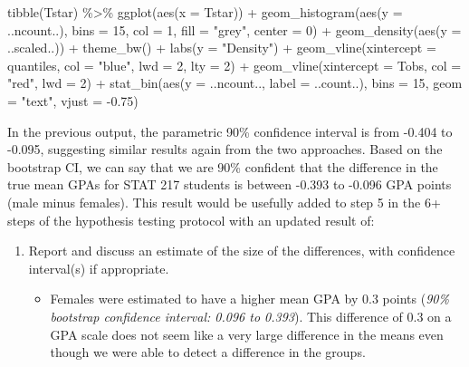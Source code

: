 \documentclass[
]{book}
\newenvironment{Shaded}{\begin{snugshade}}{\end{snugshade}}
\newcommand{\AttributeTok}[1]{\textcolor[rgb]{0.77,0.63,0.00}{#1}}
\newcommand{\DecValTok}[1]{\textcolor[rgb]{0.00,0.00,0.81}{#1}}
\newcommand{\FloatTok}[1]{\textcolor[rgb]{0.00,0.00,0.81}{#1}}
\newcommand{\FunctionTok}[1]{\textcolor[rgb]{0.00,0.00,0.00}{#1}}
\newcommand{\NormalTok}[1]{#1}
\newcommand{\SpecialCharTok}[1]{\textcolor[rgb]{0.00,0.00,0.00}{#1}}
\newcommand{\StringTok}[1]{\textcolor[rgb]{0.31,0.60,0.02}{#1}}
\providecommand{\tightlist}{%
  \setlength{\itemsep}{0pt}\setlength{\parskip}{0pt}}
\begin{document}
\begin{Shaded}
\begin{Highlighting}[]
\FunctionTok{tibble}\NormalTok{(Tstar) }\SpecialCharTok{\%\textgreater{}\%} \FunctionTok{ggplot}\NormalTok{(}\FunctionTok{aes}\NormalTok{(}\AttributeTok{x =}\NormalTok{ Tstar)) }\SpecialCharTok{+} 
  \FunctionTok{geom\_histogram}\NormalTok{(}\FunctionTok{aes}\NormalTok{(}\AttributeTok{y =}\NormalTok{ ..ncount..), }\AttributeTok{bins =} \DecValTok{15}\NormalTok{, }\AttributeTok{col =} \DecValTok{1}\NormalTok{, }\AttributeTok{fill =} \StringTok{"grey"}\NormalTok{, }
                 \AttributeTok{center =} \DecValTok{0}\NormalTok{) }\SpecialCharTok{+} 
  \FunctionTok{geom\_density}\NormalTok{(}\FunctionTok{aes}\NormalTok{(}\AttributeTok{y =}\NormalTok{ ..scaled..)) }\SpecialCharTok{+}
  \FunctionTok{theme\_bw}\NormalTok{() }\SpecialCharTok{+}
  \FunctionTok{labs}\NormalTok{(}\AttributeTok{y =} \StringTok{"Density"}\NormalTok{) }\SpecialCharTok{+}
  \FunctionTok{geom\_vline}\NormalTok{(}\AttributeTok{xintercept =}\NormalTok{ quantiles, }\AttributeTok{col =} \StringTok{"blue"}\NormalTok{, }\AttributeTok{lwd =} \DecValTok{2}\NormalTok{, }\AttributeTok{lty =} \DecValTok{2}\NormalTok{) }\SpecialCharTok{+} 
  \FunctionTok{geom\_vline}\NormalTok{(}\AttributeTok{xintercept =}\NormalTok{ Tobs, }\AttributeTok{col =} \StringTok{"red"}\NormalTok{, }\AttributeTok{lwd =} \DecValTok{2}\NormalTok{) }\SpecialCharTok{+}
  \FunctionTok{stat\_bin}\NormalTok{(}\FunctionTok{aes}\NormalTok{(}\AttributeTok{y =}\NormalTok{ ..ncount.., }\AttributeTok{label =}\NormalTok{ ..count..), }\AttributeTok{bins =} \DecValTok{15}\NormalTok{, }
           \AttributeTok{geom =} \StringTok{"text"}\NormalTok{, }\AttributeTok{vjust =} \SpecialCharTok{{-}}\FloatTok{0.75}\NormalTok{)}
\end{Highlighting}
\end{Shaded}

In the previous output, the parametric 90\% confidence interval is from
-0.404 to -0.095, suggesting similar results again from the two approaches. Based on
the bootstrap CI, we can say that we are 90\% confident that the difference in
the true mean GPAs for STAT 217 students is between -0.393
to -0.096 GPA points
(male minus females). This result would be usefully added to step 5 in the 6+ steps of the hypothesis testing protocol with an updated result of:

\begin{enumerate}
\def\labelenumi{\arabic{enumi}.}
\setcounter{enumi}{4}
\item
  Report and discuss an estimate of the size of the differences, with confidence interval(s) if appropriate. 

  \begin{itemize}
  \tightlist
  \item
    Females were estimated to have a higher mean GPA by
    0.3 points (\emph{90\%
    bootstrap confidence interval: 0.096 to
    0.393}). This difference of
    0.3 on a GPA scale does not
    seem like a very large difference in the means even though we were able to
    detect a difference in the groups.
  \end{itemize}
\end{enumerate}
\end{document}

